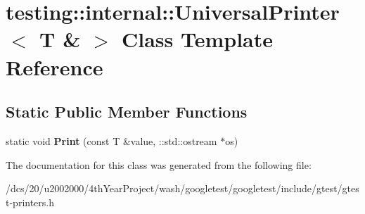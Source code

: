 \hypertarget{classtesting_1_1internal_1_1UniversalPrinter_3_01T_01_6_01_4}{}\section{testing\+:\+:internal\+:\+:Universal\+Printer$<$ T \& $>$ Class Template Reference}
\label{classtesting_1_1internal_1_1UniversalPrinter_3_01T_01_6_01_4}
\subsection*{Static Public Member Functions}
\begin{DoxyCompactItemize}
\item 
\mbox{\label{classtesting_1_1internal_1_1UniversalPrinter_3_01T_01_6_01_4_a923a694be8aa66117848c1c5f57ede35}} 
static void {\bfseries Print} (const T \&value, \+::std\+::ostream $\ast$os)
\end{DoxyCompactItemize}


The documentation for this class was generated from the following file\+:\begin{DoxyCompactItemize}
\item 
/dcs/20/u2002000/4th\+Year\+Project/wash/googletest/googletest/include/gtest/gtest-\/printers.\+h\end{DoxyCompactItemize}
